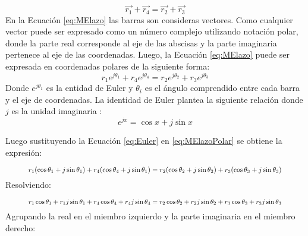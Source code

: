 \begin{equation}\label{eq:MElazo}
\vec{r_1}+\vec{r_4}=\vec{r_2}+\vec{r_3}
\end{equation}
 En la Ecuación \ref{eq:MElazo} las barras son consideras vectores. Como cualquier vector puede ser expresado como un número complejo utilizando notación polar, donde la parte real corresponde al eje de las abscisas y la parte imaginaria pertenece al eje de las coordenadas. Luego, la Ecuación \ref{eq:MElazo} puede ser expresada en coordenadas polares de la siguiente forma:
\begin{equation}\label{eq:MElazoPolar}
r_1e^{j\theta_1}+r_4e^{j\theta_4}=r_2e^{j\theta_2}+r_3e^{j\theta_3}
\end{equation}
Donde $e^{j\theta_1}$ es la entidad de Euler y $\theta_i$ es el ángulo comprendido entre cada barra y el eje de coordenadas. La identidad de Euler plantea la siguiente relación donde $j$ es la unidad imaginaria \cite{weisstein_euler_nodate}:
\begin{equation}\label{eq:Euler}
 e^{jx}=\cos{x}+j\sin{x} 
\end{equation}


Luego sustituyendo la Ecuación \ref{eq:Euler} en \ref{eq:MElazoPolar} se obtiene la expresión:

\begin{equation}\label{eq:MEPolarEuler}
\resizebox{0.9\textwidth}{!}{
$r_1(\cos{\theta_1}+j\sin{\theta_1})+r_4(\cos{\theta_4}+j\sin{\theta_1})=r_2(\cos{\theta_2}+j\sin{\theta_2})+r_3(\cos{\theta_3}+j\sin{\theta_3})$
}
\end{equation}
Resolviendo:

\begin{equation}\label{eq:MEPolarEuler2}
\resizebox{0.9\textwidth}{!}{
$r_1 \cos{\theta_1}+r_1 j \sin{\theta_1}+r_4\cos{\theta_4}+r_4j\sin{\theta_4}=r_2\cos{\theta_2}+r_2 j\sin{\theta_2}+r_3\cos{\theta_3}+r_3j\sin{\theta_3}$
}
\end{equation}
Agrupando la real en el miembro izquierdo y la parte imaginaria en el miembro derecho:

